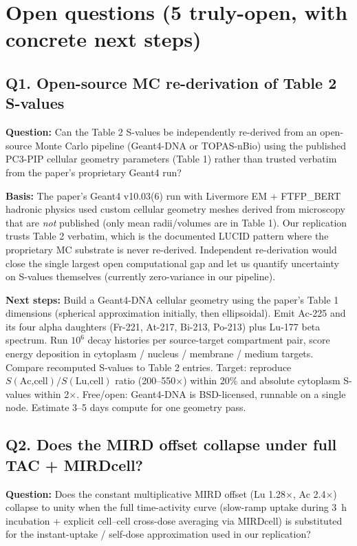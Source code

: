 \section{Open questions (5 truly-open, with concrete next steps)}
\label{sec:open}

\subsection*{Q1. Open-source MC re-derivation of Table 2 S-values}
\textbf{Question:} Can the Table 2 S-values be independently re-derived from an
open-source Monte Carlo pipeline (Geant4-DNA or TOPAS-nBio) using the published
PC3-PIP cellular geometry parameters (Table 1) rather than trusted verbatim
from the paper's proprietary Geant4 run?

\textbf{Basis:} The paper's Geant4 v10.03(6) run with Livermore EM +
FTFP\_BERT hadronic physics used custom cellular geometry meshes derived from
microscopy that are \emph{not} published (only mean radii/volumes are in
Table 1). Our replication trusts Table 2 verbatim, which is the documented
LUCID pattern where the proprietary MC substrate is never re-derived.
Independent re-derivation would close the single largest open computational
gap and let us quantify uncertainty on S-values themselves (currently
zero-variance in our pipeline).

\textbf{Next steps:} Build a Geant4-DNA cellular geometry using the paper's
Table 1 dimensions (spherical approximation initially, then ellipsoidal).
Emit Ac-225 and its four alpha daughters (Fr-221, At-217, Bi-213, Po-213)
plus Lu-177 beta spectrum. Run $10^6$ decay histories per source-target
compartment pair, score energy deposition in cytoplasm / nucleus / membrane /
medium targets. Compare recomputed S-values to Table 2 entries. Target:
reproduce $S(\text{Ac,cell})/S(\text{Lu,cell})$ ratio (200--550$\times$)
within 20\% and absolute cytoplasm S-values within 2$\times$. Free/open:
Geant4-DNA is BSD-licensed, runnable on a single node. Estimate 3--5 days
compute for one geometry pass.

\subsection*{Q2. Does the MIRD offset collapse under full TAC + MIRDcell?}
\textbf{Question:} Does the constant multiplicative MIRD offset
(Lu 1.28$\times$, Ac 2.4$\times$) collapse to unity when the full
time-activity curve (slow-ramp uptake during 3~h incubation + explicit
cell--cell cross-dose averaging via MIRDcell) is substituted for the
instant-uptake / self-dose approximation used in our replication?


